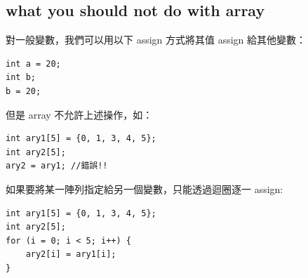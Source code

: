 \documentclass[a4paper,12pt]{article}
\begin{document}
\subsection{what you should not do with array}
\label{sec:org47a4627}
對一般變數，我們可以用以下 assign 方式將其值 assign 給其他變數：\\
\lstset{breaklines=true,language=cpp,label= ,caption= ,captionpos=b,firstnumber=1,numbers=left}
\begin{lstlisting}
int a = 20;
int b;
b = 20;
\end{lstlisting}

但是 array 不允許上述操作，如：\\
\lstset{breaklines=true,language=cpp,label= ,caption= ,captionpos=b,firstnumber=1,numbers=left}
\begin{lstlisting}
int ary1[5] = {0, 1, 3, 4, 5};
int ary2[5];
ary2 = ary1; //錯誤!!
\end{lstlisting}

如果要將某一陣列指定給另一個變數，只能透過迴圈逐一 assign:\\
\lstset{breaklines=true,language=cpp,label= ,caption= ,captionpos=b,firstnumber=1,numbers=left}
\begin{lstlisting}
int ary1[5] = {0, 1, 3, 4, 5};
int ary2[5];
for (i = 0; i < 5; i++) {
    ary2[i] = ary1[i];
}
\end{lstlisting}
\end{document}
